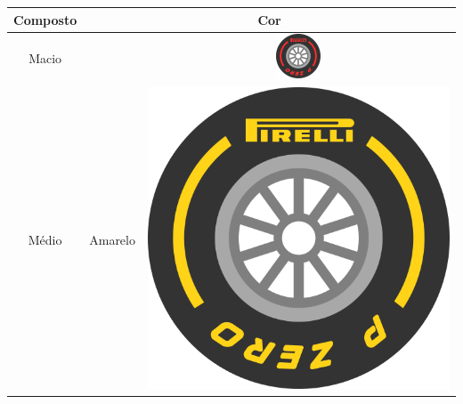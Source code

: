 \documentclass{report}
\begin{document}
\begin{table}[!h]
\centering
\begin{tabular}{|c|l|l|c|c|}
\hline
\multicolumn{3}{|c|}{Composto} & \multicolumn{2}{c|}{Cor} \\ \hline
\multicolumn{3}{|c|}{Macio}    & \cellcolor[HTML]{FD6864}{\color[HTML]{000000} Vermelho} & \includegraphics[scale=0.33]{Fotos/Pneus/Pneu_Vermelho.png} \\ \hline
\multicolumn{3}{|c|}{Médio}    & \cellcolor[HTML]{FCFF2F}Amarelo                         &  \includegraphics[scale=0.017]{Fotos/Pneus/Pneu_Amarelo.png} \\ \hline

\end{tabular}
\end{table}
\end{document}
